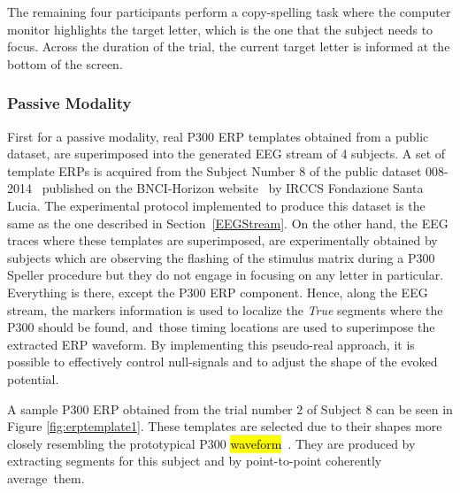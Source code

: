 \documentclass[brainsci,article,accept,moreauthors,pdftex,10pt,a4paper]{mdpi}
\begin{document}
The remaining four participants perform a copy-spelling task where the computer monitor highlights the target letter, which is the one that the subject needs to focus.  Across the duration of the trial, the current target letter is informed at the bottom of the screen.  

\subsubsection{Passive Modality}

First for a passive modality, real P300 ERP templates obtained from a public dataset, are superimposed into the generated EEG stream of 4 subjects.  A set of template ERPs is acquired from the Subject Number $8$ of the public dataset 008-2014~\citep{Riccio2013} published on the BNCI-Horizon website~\citep{Brunner2014} by IRCCS Fondazione Santa Lucia. The experimental protocol implemented to produce this dataset is the same as the one described in Section~\ref{EEGStream}. On the other hand, the EEG traces where these templates are superimposed, are experimentally obtained by subjects which are observing the flashing of the stimulus matrix during a P300 Speller procedure but they do not engage in focusing on any letter in particular. Everything is there, except the P300 ERP component. Hence, along the EEG stream, the markers information is used to localize the \textit{True} segments where the P300 should be found, and~those timing locations are used to superimpose the extracted ERP waveform.  By implementing this pseudo-real approach, it is possible to effectively control null-signals and to adjust the shape of the evoked potential.

A sample P300 ERP obtained from the trial number $2$ of Subject 8 can be seen in Figure  \ref{fig:erptemplate1}.  These templates are selected due to their shapes more closely resembling the prototypical P300 \mbox{\hl{waveform}~\citep{Rao2013,Clerc2016}}.  They are produced by extracting segments for this subject and by point-to-point coherently average~them.
\end{document}
